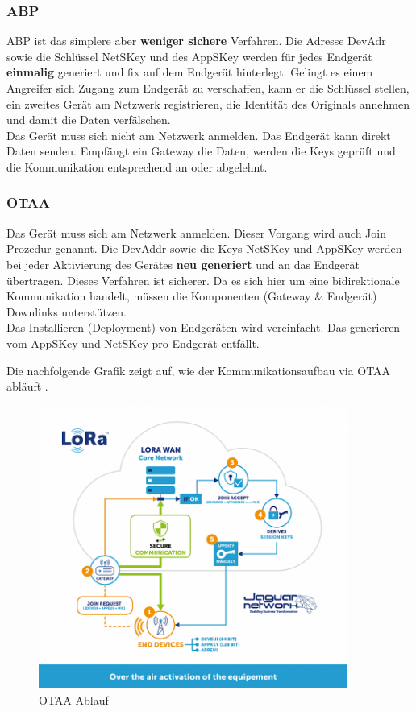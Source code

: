 \documentclass[11pt,english,german]{report}
\theoremstyle{definition}
\begin{document}
\subsubsection{ABP}
ABP ist das simplere aber \textbf{weniger sichere} Verfahren. Die Adresse DevAdr sowie die Schlüssel \gls{NetSKey} und des \gls{AppSKey} werden für jedes Endgerät \textbf{einmalig} generiert und fix auf dem Endgerät hinterlegt. Gelingt es einem Angreifer sich Zugang zum Endgerät zu verschaffen, kann er die Schlüssel stellen, ein zweites Gerät am Netzwerk registrieren, die Identität des Originals annehmen und damit die Daten verfälschen.\\[0.3cm]
Das Gerät muss sich nicht am Netzwerk anmelden. Das Endgerät kann direkt Daten senden. Empfängt ein Gateway die Daten, werden die Keys geprüft und die Kommunikation entsprechend an oder abgelehnt.

\subsubsection{OTAA}
Das Gerät muss sich am Netzwerk anmelden. Dieser Vorgang wird auch Join Prozedur genannt. Die \gls{DevAddr} sowie die Keys NetSKey und AppSKey werden bei jeder Aktivierung des Gerätes \textbf{neu generiert} und an das Endgerät übertragen. Dieses Verfahren ist sicherer. Da es sich hier um eine bidirektionale Kommunikation handelt, müssen die Komponenten (Gateway \& Endgerät) Downlinks unterstützen.\\[0.3cm]
Das Installieren (Deployment) von Endgeräten wird vereinfacht. Das generieren vom AppSKey und NetSKey pro Endgerät entfällt. 

\newpage
\noindent
Die nachfolgende Grafik zeigt auf, wie der Kommunikationsaufbau via OTAA abläuft \cite{jaguar}.
\begin{figure}[H]
	\centering
	\includegraphics[width=0.9\textwidth]{img/otaa_schema.png}
	\caption[OTAA Ablauf]
	{OTAA Ablauf}
\end{figure}
\end{document}

